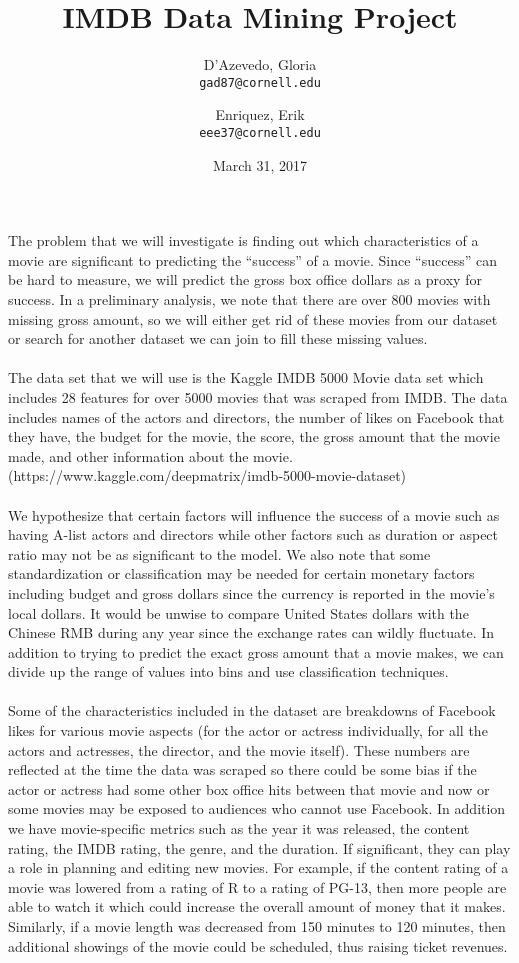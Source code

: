 \documentclass{article}
\title{IMDB Data Mining Project}
\author{
  D'Azevedo, Gloria\\
  \texttt{gad87@cornell.edu}
  \and
  Enriquez, Erik\\
  \texttt{eee37@cornell.edu}
}
\date{March 31, 2017}
\begin{document}
\maketitle

The problem that we will investigate is finding out which characteristics of a movie are significant to predicting the ``success'' of a movie.  Since ``success'' can be hard to measure, we will predict the gross box office dollars as a proxy for success.  In a preliminary analysis, we note that there are over 800 movies with missing gross amount, so we will either get rid of these movies from our dataset or search for another dataset we can join to fill these missing values.\\
\\
The data set that we will use is the Kaggle IMDB 5000 Movie data set which includes 28 features for over 5000 movies that was scraped from IMDB.  The data includes names of the actors and directors, the number of likes on Facebook that they have, the budget for the movie, the score, the gross amount that the movie made, and other information about the movie. (https://www.kaggle.com/deepmatrix/imdb-5000-movie-dataset) \\
\\
We hypothesize that certain factors will  influence the success of a movie such as having A-list actors and directors while other factors such as duration or aspect ratio may not be as significant to the model.  We also note that some standardization or classification may be needed for certain monetary factors including budget and gross dollars since the currency is reported in the movie's local dollars.  It would be unwise to compare United States dollars with the Chinese RMB during any year since the exchange rates can wildly fluctuate.  In addition to trying to predict the exact gross amount that a movie makes, we can divide up the range of values into bins and use classification techniques. \\
\\
Some of the characteristics included in the dataset are breakdowns of Facebook likes for various movie aspects (for the actor or actress individually, for all the actors and actresses, the director, and the movie itself).  These numbers are reflected at the time the data was scraped so there could be some bias if the actor or actress had some other box office hits between that movie and now or some movies may be exposed to audiences who cannot use Facebook.  In addition we have movie-specific metrics such as the year it was released, the content rating, the IMDB rating, the genre, and the duration.  If significant, they can play a role in planning and editing new movies.  For example, if the content rating of a movie was lowered from a rating of R to a rating of PG-13, then more people are able to watch it which could increase the overall amount of money that it makes.  Similarly, if a movie length was decreased from 150 minutes to 120 minutes, then additional showings of the movie could be scheduled, thus raising ticket revenues.\\
\end{document}
